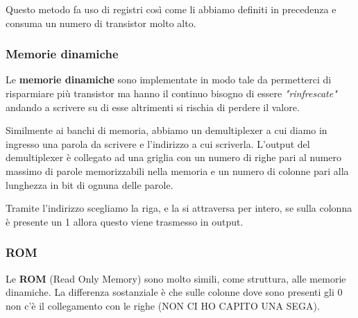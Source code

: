 Questo metodo fa uso di registri così come li abbiamo definiti in precedenza e consuma un numero di
transistor molto alto.

\subsubsection{Memorie dinamiche}
Le \textbf{memorie dinamiche} sono implementate in modo tale da permetterci di risparmiare più
transistor ma hanno il continuo bisogno di essere \emph{"rinfrescate"} andando a scrivere su di
esse altrimenti si rischia di perdere il valore.

Similmente ai banchi di memoria, abbiamo un demultiplexer a cui diamo in ingresso una parola da
scrivere e l'indirizzo a cui scriverla. L'output del demultiplexer è collegato ad una griglia
con un numero di righe pari al numero massimo di parole memorizzabili nella memoria e un numero
di colonne pari alla lunghezza in bit di ognuna delle parole.
\begin{center}
\end{center}
Tramite l'indirizzo scegliamo la riga, e la si attraversa per intero, se sulla colonna è presente
un 1 allora questo viene trasmesso in output.

\subsubsection{ROM}
Le \textbf{ROM} (Read Only Memory) sono molto simili, come struttura, alle memorie dinamiche. La
differenza sostanziale è che sulle colonne dove sono presenti gli 0 non c'è il collegamento con le
righe (NON CI HO CAPITO UNA SEGA).

